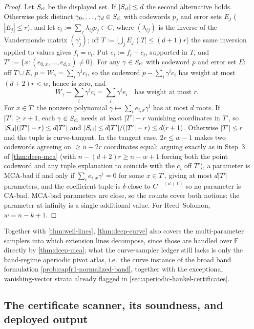 \documentclass[11pt]{article}
\theoremstyle{definition}
\theoremstyle{remark}
\newcommand{\F}{\mathbb{F}}
\begin{document}
\begin{proof}
Let $S_{\rm cl}$ be the displayed set. If $|S_{\rm cl}|\le d$ the second alternative holds. Otherwise pick distinct $\gamma_0,\dots,\gamma_d\in S_{\rm cl}$ with codewords $p_j$ and error sets $E_j$ ($|E_j|\le r$), and let $c_i:=\sum_j\lambda_{ij}p_j\in C$, where $(\lambda_{ij})$ is the inverse of the Vandermonde matrix $(\gamma_j^i)$; off $T:=\bigcup_jE_j$ ($|T|\le(d+1)r$) the same inversion applied to values gives $f_i=c_i$. Put $e_i:=f_i-c_i$, supported in $T$, and $T':=\{x:(e_{0,x},\dots,e_{d,x})\ne0\}$. For any $\gamma\in S_{\rm cl}$ with codeword $p$ and error set $E$: off $T\cup E$, $p=W_\gamma=\sum_i\gamma^ic_i$, so the codeword $p-\sum_i\gamma^ic_i$ has weight at most $(d+2)r<w$, hence is zero, and
\[
W_\gamma-\sum_i\gamma^ic_i=\sum_i\gamma^ie_i
\quad\text{has weight at most }r .
\]
For $x\in T'$ the nonzero polynomial $\gamma\mapsto\sum_ie_{i,x}\gamma^i$ has at most $d$ roots. If $|T'|\ge r+1$, each $\gamma\in S_{\rm cl}$ needs at least $|T'|-r$ vanishing coordinates in $T'$, so $|S_{\rm cl}|(|T'|-r)\le d|T'|$ and $|S_{\rm cl}|\le d|T'|/(|T'|-r)\le d(r+1)$. Otherwise $|T'|\le r$ and the tuple is curve-tangent. In the tangent case, $2r\le w-1$ makes two codewords agreeing on $\ge n-2r$ coordinates equal; arguing exactly as in Step~3 of \cref{thm:deep-mca} \textup(with $n-(d+2)r\ge n-w+1$ forcing both the point codeword and any tuple explanation to coincide with the $c_i$ off $T'$\textup), a parameter is MCA-bad if and only if $\sum_ie_{i,x}\gamma^i=0$ for some $x\in T'$, giving at most $d|T'|$ parameters, and the coefficient tuple is $\delta$-close to $C^{\equiv(d+1)}$ so no parameter is CA-bad. MCA-bad parameters are close, so the counts cover both notions; the parameter at infinity is a single additional value. For Reed--Solomon, $w=n-k+1$.
\end{proof}

Together with \cref{thm:weil-lines}, \cref{thm:deep-curve} also covers the multi-parameter samplers into which extension lines decompose, since those are handled over $\F$ directly by \cref{thm:deep-mca}; what the curve-sampler ledger still lacks is only the band-regime aperiodic pivot atlas, i.e.\ the curve instance of the broad band formulation \cref{prob:capfr1-normalized-band}, together with the exceptional vanishing-vector strata already flagged in \cref{sec:aperiodic-hankel-certificates}.

\subsection{The certificate scanner, its soundness, and deployed output}\label{sec:discharge-T6}
\end{document}
